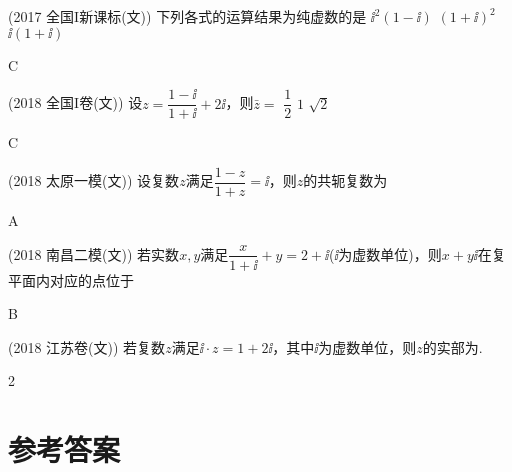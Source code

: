   \begin{exercise}
    \item %
        {\kaishu (2017 \textbullet 全国I新课标(文))}
        下列各式的运算结果为纯虚数的是\xz
         {$\ii^2(1-\ii)$}
         {$(1+\ii)^2$}
         {$\ii(1+\ii)$}
        \begin{answer}
          C
        \end{answer}
    \item %
        {\kaishu (2018 \textbullet 全国I卷(文))}
        设$z=\dfrac{1-\ii}{1+\ii}+2\ii$，则$\bar z=$\xz
         {$\dfrac12$}
         {$1$}
         {$\sqrt2$}
        \begin{answer}
          C
        \end{answer}
    \item %
        {\kaishu (2018 \textbullet 太原一模(文))}
        设复数$z$满足$\dfrac{1-z}{1+z}=\ii$，则$z$的共轭复数为\xz
        \xx{$\ii$}{$-\ii$}{$2\ii$}{$-2\ii$}
        \begin{answer}
          A
        \end{answer}
    \item %
        {\kaishu (2018 \textbullet 南昌二模(文))}
        若实数$x,y$满足$\dfrac{x}{1+\ii}+y=2+\ii$($\ii$为虚数单位)，则$x+y\ii$在复平面内对应的点位于\xz
        \begin{answer}
          B
        \end{answer}
    \item %
        {\kaishu (2018 \textbullet 江苏卷(文))}
        若复数$z$满足$\ii\cdot z=1+2\ii$，其中$\ii$为虚数单位，则$z$的实部为\tk.
        \begin{answer}
          2
        \end{answer}
  \end{exercise}
\stopexercise

\newpage
\section{参考答案}
\begin{multicols}{2}
  \printanswer
\end{multicols}
